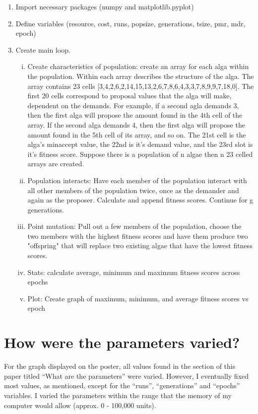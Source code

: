 \documentclass[]{article}
\begin{document}
\begin{enumerate}[\{1\}]
\item Import necessary packages (numpy and matplotlib.pyplot)
\item Define variables (resource, cost, runs, popsize, generations, tsize, pmr, mdr, epoch)
\item Create main loop. 
    \begin{enumerate}[i)]
        \item Create characteristics of population: create an array for each alga within the population. Within each array describes the structure of the alga. The array contains 23 cells [3,4,2,6,2,14,15,13,2,6,7,8,6,4,3,3,7,8,9,9,7,18,0].
The first 20 cells correspond to proposal values that the alga will make, dependent on the demands. For example, if a second agla demands 3, then the first alga will propose the amount found in the 4th cell of the array. If the second alga demands 4, then the first alga will propose the amount found in the 5th cell of its array, and so on. The 21st cell is the alga's minaccept value, the 22nd is it's demand value, and the 23rd slot is it's fitness score. Suppose there is a population of n algae then n 23 celled arrays are created.   
        \item Population interacts: Have each member of the population interact with all other members of the population twice, once as the demander and again as the proposer. Calculate and append fitness scores. Continue for g generations. 
        \item Point mutation: Pull out a few members of the population, choose the two members with the highest fitness scores and have them produce two "offspring" that will replace two existing algae that have the lowest fitness scores.
        \item Stats: calculate average, minimum and maximum fitness scores across epochs
        \item Plot: Create graph of maximum, minimum, and average fitness scores vs epoch
            \end{enumerate}
\end{enumerate}

\section{How were the parameters
varied?}\label{how-were-the-parameters-varied}

For the graph displayed on the poster, all values found in the section
of this paper titled ``What are the parameters'' were varied. However, I
eventually fixed most values, as mentioned, except for the ``runs'',
``generations'' and ``epochs'' variables. I varied the parameters within
the range that the memory of my computer would allow (approx. 0 -
100,000 units).
\end{document}

